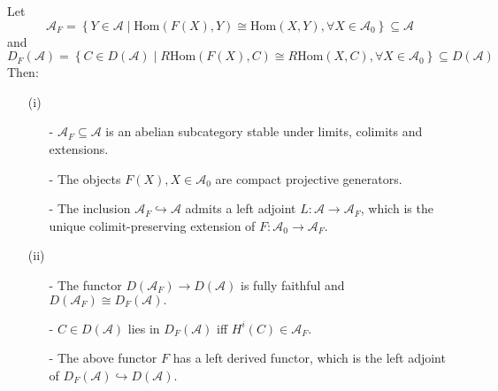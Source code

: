 \documentclass[UTF8,12,a4paper]{ctexart}
\theoremstyle{definition}
\begin{document}
Let 
$$\mathcal{A}_F=\left\{Y\in\mathcal{A}\mid  
\text{Hom}(F(X),Y)\cong \text{Hom}(X,Y), \forall X\in\mathcal{A}_0
\right\}\subseteq \mathcal{A}$$
and 
$$
D_F(\mathcal{A})=\left\{C\in D(\mathcal{A})\mid  
R\text{Hom}(F(X),C)\cong R\text{Hom}(X,C), \forall X\in\mathcal{A}_0
\right\}\subseteq D(\mathcal{A})
$$
Then:
\begin{itemize}
\item [(i)]
	\begin{itemize}
		\item [-]	$\mathcal{A}_F \subseteq \mathcal{A}$ is an abelian subcategory stable under limits, colimits and extensions.
		\item [-]The objects $F(X), X\in \mathcal{A}_0$ are compact projective generators.
		\item [-]	The inclusion $\mathcal{A}_F\hookrightarrow \mathcal{A}$ admits a left adjoint $L:\mathcal{A}\rightarrow \mathcal{A}_F$, which is the unique colimit-preserving extension of $F:\mathcal{A}_0\rightarrow\mathcal{A}_F.$
	\end{itemize}
\item [(ii)] 
	\begin{itemize}
		\item [-]	The functor $D(\mathcal{A}_F)\rightarrow D(\mathcal{A})$ is fully faithful and $D(\mathcal{A}_F)\cong D_F(\mathcal{A}).$
		\item [-]$C\in D(\mathcal{A})$ lies in $D_F(\mathcal{A})$ iff $H^i(C)\in \mathcal{A}_F.$
		\item [-]	The above functor $F$ has a left derived functor, which is the left adjoint of $D_F(\mathcal{A})\hookrightarrow D(\mathcal{A}).$
	\end{itemize}
\end{itemize}
\end{document}
